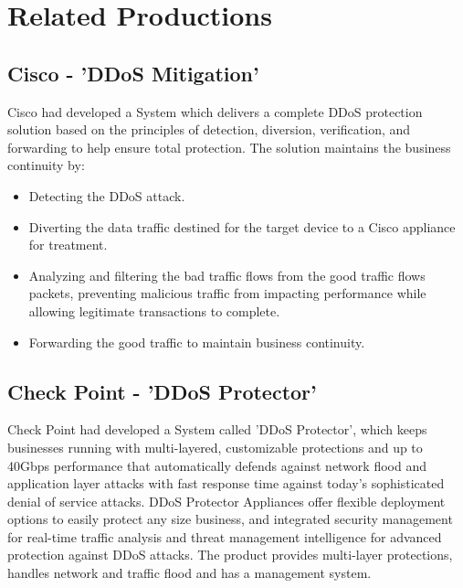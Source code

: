 \documentclass{report}
\begin{document}
\section {Related Productions}
\subsection {Cisco - 'DDoS Mitigation' } 
Cisco had developed a System which delivers a complete DDoS protection solution based on the principles of detection, diversion, verification, and forwarding to help ensure total protection\cite{cisco}. The solution maintains the business continuity by: 
\begin{itemize}
\item Detecting the DDoS attack.
\item Diverting  the data traffic destined for the target device to  a Cisco appliance for treatment.
\item Analyzing and filtering  the bad traffic flows from the good traffic flows packets, preventing malicious traffic from impacting performance while allowing legitimate transactions to complete.
\item Forwarding  the good traffic to maintain business continuity.
\end{itemize}

\subsection {Check Point -  'DDoS Protector' }
Check Point had developed a System called 'DDoS Protector'\cite{checkpoint}, which keeps businesses running with multi-layered, customizable protections and up to 40Gbps performance that automatically defends against network flood and application layer attacks with fast response time against today’s sophisticated denial of service attacks.
\hfill \break
DDoS Protector Appliances offer flexible deployment options to easily protect any size business, and integrated security management for real-time traffic analysis and threat management intelligence for advanced protection against DDoS attacks.
The product provides multi-layer protections, handles network and traffic flood and has a management system.
  \hfill \break



\newpage
{}
\printbibliography[title=References]
\end{document}
